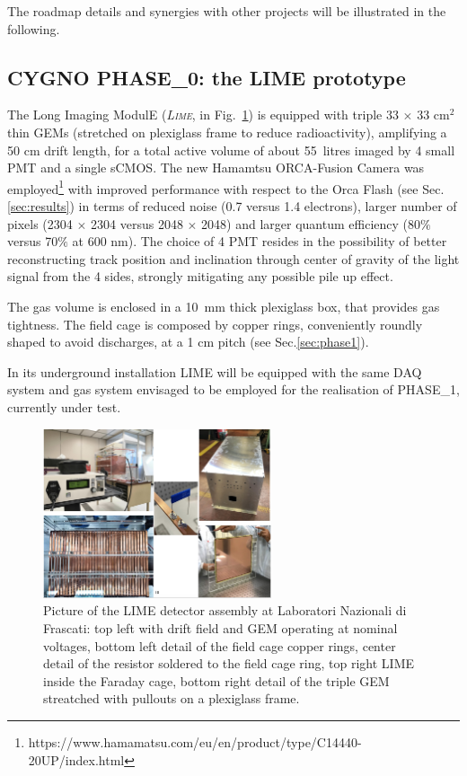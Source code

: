 \documentclass[physics,article,submit,moreauthors,pdftex]{Definitions/mdpi}
\newcommand{\lime}{{\textsc{Lime}}\xspace}
\begin{document}

The roadmap details and synergies with other projects will be illustrated in the following. 

\subsection{CYGNO PHASE\_0: the LIME prototype}\label{sec:phase0}

The Long Imaging ModulE ({\it \lime}, in Fig.~\ref{fig:LIME_pic}) is equipped with triple 33 $\times$ 33 cm$^2$ thin GEMs (stretched on plexiglass frame to reduce radioactivity), amplifying a 50 cm drift length, for a total active volume of about 55~litres imaged by 4 small PMT and a single sCMOS. The new Hamamtsu ORCA-Fusion Camera was employed\footnote{https://www.hamamatsu.com/eu/en/product/type/C14440-20UP/index.html} with improved performance with respect to the Orca Flash (see Sec.\ref{sec:results}) in terms of reduced noise (0.7 versus 1.4 electrons), larger number of pixels (2304 $\times$ 2304 versus 2048 $\times$ 2048) and larger quantum efficiency (80$\%$ versus 70$\%$ at 600 nm). 
The choice of 4 PMT resides in the possibility of better reconstructing track position and inclination through center of gravity of the light signal from the 4 sides, strongly mitigating any possible pile up effect.

The gas volume is enclosed in a 10~mm thick plexiglass box, that provides gas tightness. The field cage is composed by copper rings, conveniently roundly shaped to avoid discharges, at a 1 cm pitch (see Sec.\ref{sec:phase1}).

In its underground installation LIME will be equipped with the same DAQ system and gas system envisaged to be employed for the realisation of PHASE\_1, currently under test.

\begin{figure}[!t]
\centering
 \includegraphics[width=0.6\textwidth]{LIME_pic.jpeg}
 \caption{Picture of the LIME detector assembly at Laboratori Nazionali di Frascati: top left with drift field and GEM operating at nominal voltages, bottom left detail of the field cage copper rings, center detail of the resistor soldered to the field cage ring, top right LIME inside the Faraday cage, bottom right detail of the triple GEM streatched with pullouts on a plexiglass frame.}
 \label{fig:LIME_pic}
 \end{figure}
\end{document}
